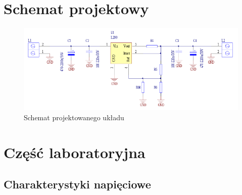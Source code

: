 \documentclass[a4paper,12pt]{article}
\begin{document}
\section {Schemat projektowy}
\begin{figure}[h]
  \center
  \includegraphics[width=1\textwidth]{schemat_ukladu}
  \caption{Schemat projektowanego układu}
\end{figure}
\pagebreak
\section{Część laboratoryjna}
\subsection{Charakterystyki napięciowe}
\end{document}

